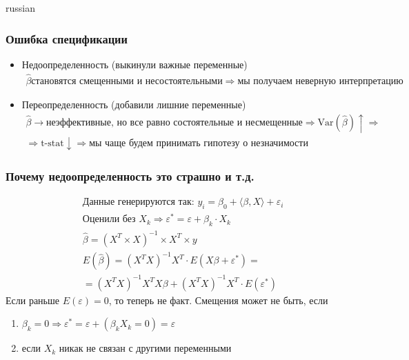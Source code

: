 \documentclass{article}
\begin{document}
\begin{otherlanguage*}{russian}
\subsubsection*{Ошибка спецификации}
\begin{itemize}
\item Недоопределенность (выкинули важные переменные) 
\begin{align*}
\hat \beta \text{становятся смещенными и несостоятельными} \Rightarrow \text{мы получаем неверную интерпретацию} 
\end{align*}
\item Переопределенность (добавили лишние переменные) 
\begin{align*}
\hat \beta \rightarrow \text{неэффективные, но все равно состоятельные и несмещенные} \Rightarrow \text{Var} (\hat \beta) \uparrow \Rightarrow \\
\Rightarrow \text{t-stat} \downarrow \Rightarrow \text{мы чаще будем принимать гипотезу о незначимости} 
\end{align*}
\end{itemize}
\subsubsection*{Почему недоопределенность это страшно и т.д.}
\begin{align*}
& \text{Данные генерируются так: } y_i = \beta_0 + \langle \beta, X \rangle + \varepsilon_i \\
& \text{Оценили без } X_k \Rightarrow \varepsilon^* = \varepsilon + \beta_k \cdot X_k \\
& \hat \beta = (X^T  \times X) ^{-1} \times X^T \times y \\
& E ( \hat \beta ) = (X^T X) ^{-1} X^T \cdot E(X \beta + \varepsilon^*) = \\
& = (X^T X) ^ { -1} X^T X \beta + (X^T X ) ^{-1} X^T \cdot E ( \varepsilon^* ) 
\end{align*} 
Если раньше $ E(\varepsilon) = 0 $, то теперь не факт. 
Смещения может не быть, если 
\begin{enumerate}
\item $ \beta_k = 0 \Rightarrow \varepsilon^* = \varepsilon +( \beta_k X_k = 0) = \varepsilon $
\item если $ X_k $ никак не связан с другими переменными 

\end{enumerate}
\end{otherlanguage*}
\end{document}
